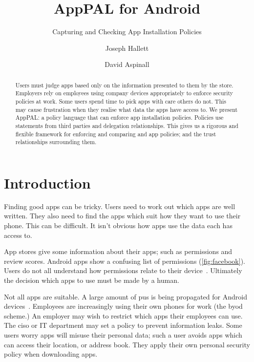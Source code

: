 \documentclass[]{scrartcl}
\title{AppPAL for Android}
\subtitle{Capturing and Checking App Installation Policies}
\author{Joseph Hallett \and David Aspinall }
\newcommand{\comment}[1]{}%
\begin{document}
\maketitle{}

\begin{abstract}
  Users must judge apps based only on the information presented to them by the store.
  Employers rely on employees using company devices appropriately to enforce security policies at work.
  Some users spend time to pick apps with care others do not.
  This may cause frustration when they realise what data the apps have access to.
  We present AppPAL: a policy language that can enforce app installation policies.
  Policies use statements from third parties and delegation relationships.
  This gives us a rigorous and flexible framework for enforcing and comparing and app policies; and the trust relationships surrounding them.
\end{abstract}

\section{Introduction \comment{1 page}}
\label{sec:introduction}

Finding good apps can be tricky.
Users need to work out which apps are well written.
They also need to find the apps which suit how they want to use their phone.
This can be difficult.
It isn't obvious how apps use the data each has access to.

App stores give some information about their apps; such as permissions and review scores.
Android apps show a confusing list of permissions (\autoref{fig:facebook}).
Users do not all understand how permissions relate to their device~\citep{Felt:2012hm,Thompson:2013eb}.
Ultimately the decision which apps to use must be made by a human.

Not all apps are suitable.
A large amount of \ac{pus} is being propagated for Android devices~\citep{Truong:2014bi,Svajcer:2013tp}.
Employees are increasingly using their own phones for work (the \ac{byod} scheme.)
An employer may wish to restrict which apps their employees can use.
The \ac{ciso} or IT department may set a policy to prevent information leaks.
Some users worry apps will misuse their personal data;
  such a user avoids apps which can access their location, or address book.
They apply their own personal security policy when downloading apps.
\end{document}
